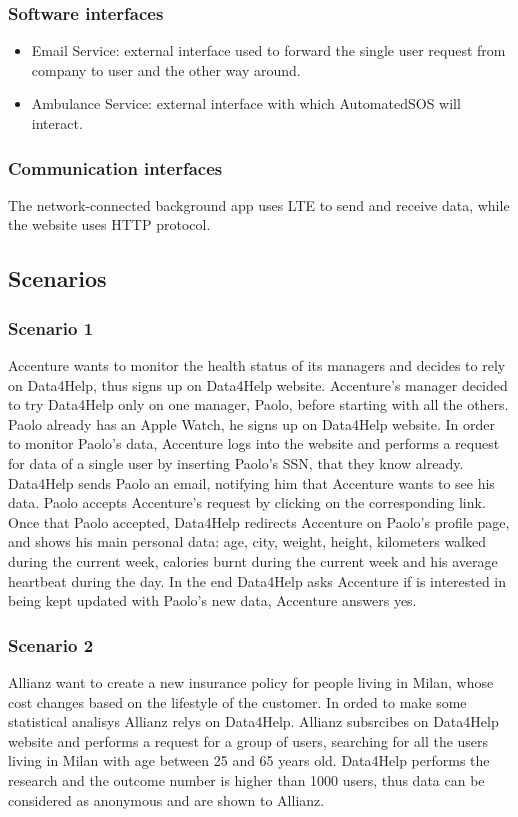 \documentclass{article}
\begin{document}
\subsubsection{Software interfaces}
\begin{itemize}
	\item Email Service: external interface used to forward the single user request from company to user and the other way around. 
	\item Ambulance Service: external interface with which AutomatedSOS will interact. 
\end{itemize}
\subsubsection{Communication interfaces}
The network-connected background app uses LTE to send and receive data, while the website uses HTTP protocol.
\subsection{Scenarios}
\subsubsection{Scenario 1}
Accenture wants to monitor the health status of its managers and decides to rely on Data4Help, thus signs up on Data4Help website.
Accenture's manager decided to try Data4Help only on one manager, Paolo, before starting with all the others. Paolo already has an Apple Watch, he signs up on Data4Help website.
In order to monitor Paolo's data, Accenture logs into the website and performs a request for data of a single user by inserting Paolo's SSN, that they know already.
Data4Help sends Paolo an email, notifying him that Accenture wants to see his data.
Paolo accepts Accenture's request by clicking on the corresponding link.
Once that Paolo accepted, Data4Help redirects Accenture on Paolo's profile page, and shows his main personal data: age, city, weight, height, kilometers walked during the current week, calories burnt during the current week and his average heartbeat during the day.
In the end Data4Help asks Accenture if is interested in being kept updated with Paolo's new data, Accenture answers yes.
\subsubsection{Scenario 2}
Allianz want to create a new insurance policy for people living in Milan, whose cost changes based on the lifestyle of the customer. In orded to make some statistical analisys Allianz relys on Data4Help.
Allianz subsrcibes on Data4Help website and performs a request for a group of users, searching for all the users living in Milan with age between 25 and 65 years old.
Data4Help performs the research and the outcome number is higher than 1000 users, thus data can be considered as anonymous and are shown to Allianz.
\end{document}

